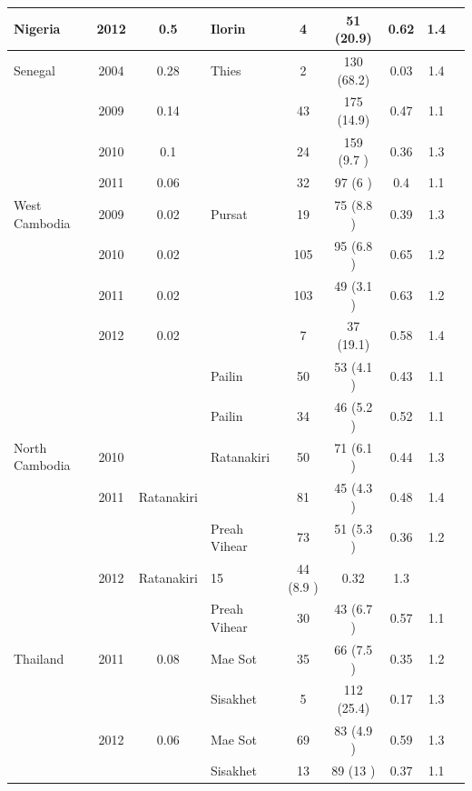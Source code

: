 \documentclass[9pt,lineno]{elife}
\begin{document}
\begin{table}[btp]
{\begin{tabular}{p{1.4cm} c c |p{1.7cm} c c c c p{2.7cm}}
\cline{1-8}
Nigeria         &2012           &0.5   &Ilorin&4    &51   (20.9)&0.62 &1.4  &\\
\hline
Senegal         &2004           &0.28  &Thies&2    &130  (68.2)&0.03 &1.4  &\citet{Wong2017}\\
                &2009           &0.14  &               &43   &175  (14.9)&0.47 &1.1  &\\
                &2010           &0.1   &               &24   &159  (9.7 )&0.36 &1.3  &\\
                &2011           &0.06  &               &32   &97   (6   )&0.4  &1.1  &\\
\hline
\hline
West Cambodia   &2009           &0.02  &Pursat&19   &75   (8.8 )&0.39 &1.3  &\multirow{3}{*}{\parbox{3.4cm}{\citet{Amato2017, eLife2016}}}\\
                &2010           &0.02  &               &105  &95   (6.8 )&0.65 &1.2  &\\
                &2011           &0.02  &      &103  &49   (3.1   )&0.63 &1.2  &\\
                &2012           &0.02  &      &7    &37   (19.1)&0.58 &1.4  &\\
                &               &      &Pailin&50   &53   (4.1 )&0.43 &1.1  &\\
                &               &      &Pailin&34   &46   (5.2 )&0.52 &1.1  &\\
\hline
North Cambodia  &2010&      &Ratanakiri&50   &71   (6.1 )&0.44 &1.3  &\\
                &2011        &Ratanakiri      &          &81   &45   (4.3 )&0.48 &1.4  &\\
                &           &      &Preah Vihear&73   &51   (5.3 )&0.36 &1.2  &\\
                &2012           &Ratanakiri  &15   &44   (8.9 )&0.32 &1.3  &\\
                &           &      &Preah Vihear&30   &43   (6.7 )&0.57 &1.1  &\\
\hline
Thailand        &2011           &0.08  &Mae Sot&35   &66   (7.5 )&0.35 &1.2  &\multirow{3}{*}{\parbox{3.4cm}{\citet{Miotto2013, eLife2016}}}\\
                &               &      &Sisakhet&5    &112  (25.4)&0.17 &1.3  &\\
                &2012           &0.06  &Mae Sot&69   &83   (4.9 )&0.59 &1.3  &\\
                &               &      &Sisakhet&13   &89   (13  )&0.37 &1.1  &\\

\end{tabular}}
\end{table}
\end{document}
